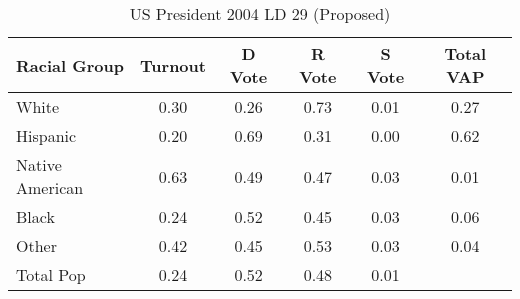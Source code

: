 \begin{table}[htb]
\begin{center}
\caption{US President 2004 LD 29 (Proposed)}
\label{pres04_vap_ld_29}
\begin{tabular}{lccccc}
  \hline
Racial Group & Turnout & D Vote & R Vote & S Vote & Total VAP \\ 
  \hline
White & 0.30 & 0.26 & 0.73 & 0.01 & 0.27 \\ 
  Hispanic & 0.20 & 0.69 & 0.31 & 0.00 & 0.62 \\ 
  Native American & 0.63 & 0.49 & 0.47 & 0.03 & 0.01 \\ 
  Black & 0.24 & 0.52 & 0.45 & 0.03 & 0.06 \\ 
  Other & 0.42 & 0.45 & 0.53 & 0.03 & 0.04 \\ 
  Total Pop & 0.24 & 0.52 & 0.48 & 0.01 &  \\ 
   \hline
\end{tabular}
\end{center}
\end{table}
